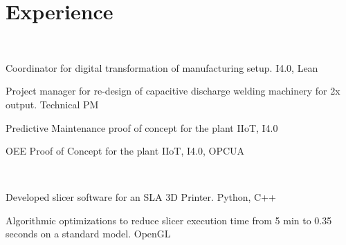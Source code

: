 \documentclass[]{deedy-resume-openfont}
\begin{document}
\begin{minipage}[t]{0.66\textwidth} 



\section{Experience}

\sectionsep



\\
\vspace{\topsep}
\begin{tightemize}
\item Coordinator for digital transformation of manufacturing setup. \hfill{ \selectfont I4.0, Lean}
\item Project manager for re-design of capacitive discharge welding machinery for 2x output. \hfill{ \selectfont Technical PM}
\item Predictive Maintenance proof of concept for the plant \hfill{ \selectfont IIoT, I4.0}
\item OEE Proof of Concept for the plant \hfill{ \selectfont IIoT, I4.0, OPCUA}
\end{tightemize}
\sectionsep

\\
\begin{tightemize}
\item Developed slicer software for an SLA 3D Printer. \hfill {
\selectfont 
Python, C++
} 
\item Algorithmic optimizations to reduce slicer execution time from 5 min to 0.35 seconds on a standard model. \hfill {
\selectfont 
OpenGL
}
\end{tightemize}

\sectionsep{}


\end{minipage}
\end{document}
